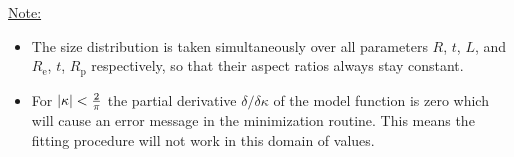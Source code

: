 \vspace{5mm}

\uline{Note:}
\begin{itemize}
\item The size distribution is taken simultaneously over all parameters $R$, $t$, $L$, and $R_\mathrm{e}$, $t$, $R_\mathrm{p}$ respectively, so that their aspect ratios always stay constant.
\item For $\abs{\kappa}<\frac{2}{\pi}$ the partial derivative $\delta /\delta\kappa$ of the model function is zero which will cause an error message in the minimization routine. This means the fitting procedure will not work in this domain of values.
\end{itemize}
